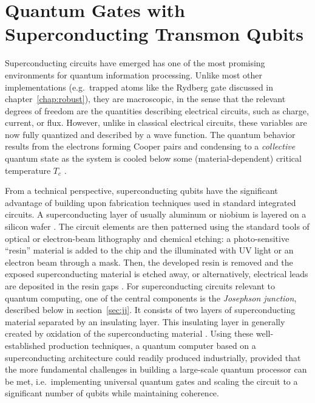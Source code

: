 \chapter{Quantum Gates with Superconducting Transmon Qubits}
\label{chap:tmintro}

Superconducting circuits have emerged has one of the most promising
environments for quantum information processing. Unlike most other
implementations (e.g.\ trapped atoms like the Rydberg gate discussed in
chapter~\ref{chap:robust}), they are macroscopic, in the sense that the relevant
degrees of freedom are the quantities describing electrical circuits, such as
charge, current, or flux. However, unlike in classical electrical circuits,
these variables are now fully quantized and described by a wave function. The
quantum behavior results from the electrons forming Cooper pairs and condensing
to a \emph{collective} quantum state as the system is cooled below some
(material-dependent) critical temperature $T_c$ \cite{TinkhamBook}.

From a technical perspective, superconducting qubits have the significant
advantage of building upon fabrication techniques used in standard integrated
circuits. A superconducting layer of usually aluminum or niobium is layered on
a silicon wafer
\cite{DevoretQIP2004, FrunzioITAS2005}.
The circuit elements are then patterned using the standard tools of optical or
electron-beam lithography and chemical etching: a photo-sensitive ``resin''
material is added to the chip and the illuminated with UV light or an electron
beam through a mask. Then, the developed resin is removed and the
exposed superconducting material is etched away, or alternatively, electrical
leads are deposited in the resin gaps \cite{HirstSCHandbook2003}.
For superconducting circuits relevant to quantum computing, one of the central
components is the \emph{Josephson junction}, described below in
section~\ref{sec:jj}. It consists of two layers of superconducting material
separated by an insulating layer. This insulating layer in generally created by
oxidation of the superconducting material \cite{DevoretQIP2004,
FrunzioITAS2005}. Using these well-established production techniques,
a quantum computer based on a superconducting architecture could readily
produced industrially, provided that the more fundamental challenges in building
a large-scale quantum processor can be met, i.e.\ implementing universal quantum
gates and scaling the circuit to a significant number of qubits while
maintaining coherence.

